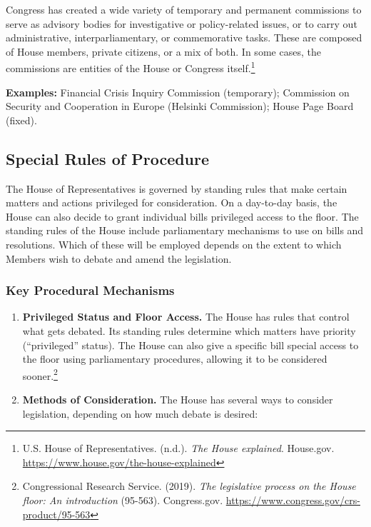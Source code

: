 Congress has created a wide variety of temporary and permanent commissions to serve as advisory bodies for investigative or policy-related issues, or to carry out administrative, interparliamentary, or commemorative tasks. These are composed of House members, private citizens, or a mix of both. In some cases, the commissions are entities of the House or Congress itself.\footnote{U.S. House of Representatives. (n.d.). \emph{The House explained}. House.gov. \url{https://www.house.gov/the-house-explained}}

\textbf{Examples:} Financial Crisis Inquiry Commission (temporary); Commission on Security and Cooperation in Europe (Helsinki Commission); House Page Board (fixed).

\subsection{Special Rules of Procedure}

The House of Representatives is governed by standing rules that make certain matters and actions privileged for consideration. On a day-to-day basis, the House can also decide to grant individual bills privileged access to the floor. The standing rules of the House include parliamentary mechanisms to use on bills and resolutions. Which of these will be employed depends on the extent to which Members wish to debate and amend the legislation.

\subsubsection{Key Procedural Mechanisms}

\begin{enumerate}
  \item \textbf{Privileged Status and Floor Access.} The House has rules that control what gets debated. Its standing rules determine which matters have priority (“privileged” status). The House can also give a specific bill special access to the floor using parliamentary procedures, allowing it to be considered sooner.\footnote{Congressional Research Service. (2019). \emph{The legislative process on the House floor: An introduction} (95-563). Congress.gov. \url{https://www.congress.gov/crs-product/95-563}}
  \item \textbf{Methods of Consideration.} The House has several ways to consider legislation, depending on how much debate is desired:
\end{enumerate}

